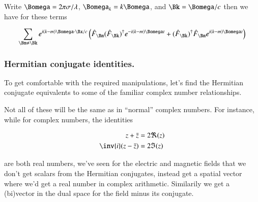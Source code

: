\documentclass{article}
\begin{document}
Write $\Bomega = 2 \pi \sigma / \lambda$, $\Bomega_k = k \Bomega$, and $\Bk = \Bomega/c$ then we have for these terms

\begin{align*}
\sum_{\Bm \ne \Bk} 
e^{ i (k-m) \Bomega \cdot \Bx/c } \left( 
\hat{F}_{\Bm} (\hat{F}_{\Bk})^{\dagger} e^{ -i (k-m) \Bomega t }
+
(\hat{F}_{\Bk})^{\dagger} \hat{F}_{\Bm} e^{ i (k-m)\Bomega t }
\right)
\\
\end{align*}

\subsubsection{ Hermitian conjugate identities. }

To get comfortable with the required manipulations, let's 
find the Hermitian conjugate equivalents to some of the familiar complex number relationships.

Not all of these will be the same as in ``normal'' complex numbers.  For instance, while for complex numbers, the identities

\begin{align*}
z + \bar{z} &= 2 \Re(z) \\
\inv{i}( z - \bar{z} ) &= 2 \Im(z)
\end{align*}

are both real numbers, we've seen for the electric and magnetic fields that we don't get scalars from the Hermitian conjugates, instead get a spatial vector where we'd get a real number in complex arithmetic.  Similarily we get a (bi)vector in the dual
space for the field minus its conjugate.
\end{document}
